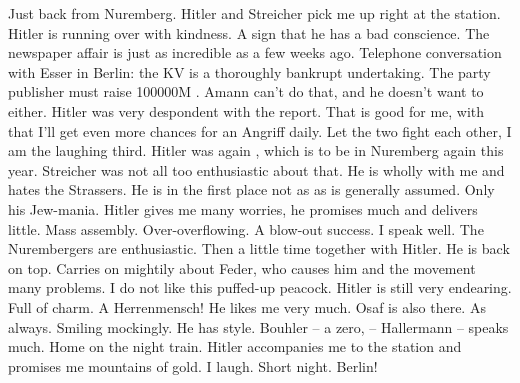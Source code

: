 Just back from Nuremberg. Hitler and Streicher pick me up right at the station. Hitler is running over with kindness. A sign that he has a bad conscience. The newspaper affair is just as incredible as a few weeks ago. Telephone conversation with Esser in Berlin: the KV is a thoroughly bankrupt undertaking. The party publisher must raise 100000M . Amann can't do that, and he doesn't want to either. Hitler was very despondent with the report. That is good for me, with that I'll get even more chances for an Angriff daily. Let the two fight each other, I am the laughing third. Hitler was again , which is to be in Nuremberg again this year. Streicher was not all too enthusiastic about that. He is wholly with me and hates the Strassers. He is in the first place not as \missing as is generally assumed. Only his Jew-mania. Hitler gives me many worries, he promises much and delivers little. Mass assembly. Over-overflowing. A blow-out success. I speak well. The Nurembergers are enthusiastic. Then a little time together with Hitler. He is back on top. Carries on mightily about Feder, who causes him and the movement many problems. I do not like this puffed-up peacock. Hitler is still very endearing. Full of charm. A Herrenmensch! He likes me very much. Osaf is also there. As always. Smiling mockingly. He has style. Bouhler -- a zero, -- Hallermann -- speaks much. Home on the night train. Hitler accompanies me to the station and promises me mountains of gold. I laugh. Short night. Berlin!

